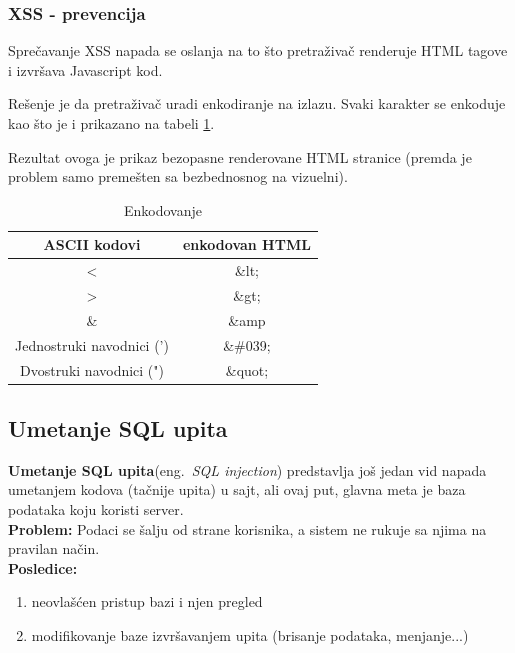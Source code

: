 \documentclass[a4paper]{article}
\begin{document}
\subsubsection{XSS - prevencija}

Sprečavanje XSS \cite{XSS_prev} napada se oslanja na to što pretraživač renderuje HTML tagove i izvršava Javascript kod.  

Rešenje je da pretraživač uradi enkodiranje na izlazu. Svaki karakter se enkoduje kao što je i prikazano na tabeli \ref{kodiranje}.

Rezultat ovoga je prikaz bezopasne renderovane HTML stranice (premda je problem samo premešten sa bezbednosnog na vizuelni).


\begin{table}[ht]

\begin{center}
\caption{Enkodovanje}
\begin{tabular}{ | c | c | }
\hline
	\rowcolor{yellow}
\textbf{ASCII kodovi} & \textbf{enkodovan HTML} \\
	\hline
 < & \&lt; \\ 
 \hline
 > & \&gt; \\  
 \hline
 \& & \&amp \\
 \hline
 Jednostruki navodnici (') & \&\#039;\\
 \hline
 Dvostruki navodnici (") & \&quot;\\  
 \hline  
\end{tabular}

\label{kodiranje}
\end{center}
\end{table}

\subsection{Umetanje SQL upita}

\textbf{Umetanje SQL upita}(eng.~{\em SQL injection}) \cite{SQL} predstavlja još jedan vid napada umetanjem kodova (tačnije upita) u sajt, ali ovaj put, glavna meta je baza podataka koju koristi server.\\
\textbf{Problem:} Podaci se šalju od strane korisnika, a sistem ne rukuje sa njima na pravilan način.\\
\textbf{Posledice:} 
\begin{enumerate}
	\item neovlašćen pristup bazi i njen pregled
	\item modifikovanje baze izvršavanjem upita (brisanje podataka, menjanje...)
\end{enumerate}
\end{document}
